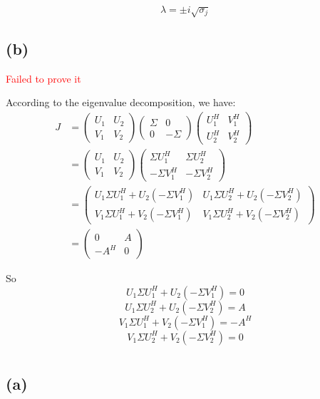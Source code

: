 \documentclass{article}
\begin{document}
$$
\lambda=\pm i\sqrt{\sigma_j}
$$

\subsection*{(b)} 

\textcolor{red}{Failed to prove it}

According to the eigenvalue decomposition, we have:
\begin{align*}
	J &= \begin{pmatrix} U_1 & U_2 \\ V_1 & V_2 \end{pmatrix} \begin{pmatrix} \Sigma & 0 \\ 0 & -\Sigma \end{pmatrix} \begin{pmatrix} U_1^H & V_1^H \\ U_2^H & V_2^H \end{pmatrix}\\
	&= \begin{pmatrix} U_1 & U_2 \\ V_1 & V_2 \end{pmatrix} \begin{pmatrix} \Sigma U_1^H & \Sigma U_2^H \\ -\Sigma V_1^H & -\Sigma V_2^H \end{pmatrix}\\
	&=\begin{pmatrix} U_1\Sigma U_1^H + U_2(-\Sigma V_1^H) & U_1\Sigma U_2^H + U_2(-\Sigma V_2^H) \\ V_1\Sigma U_1^H + V_2(-\Sigma V_1^H) & V_1\Sigma U_2^H + V_2(-\Sigma V_2^H) \end{pmatrix}\\
	&= \begin{pmatrix} 0 & A \\ -A^H & 0 \end{pmatrix}
\end{align*}

So
$$ U_1\Sigma U_1^H + U_2(-\Sigma V_1^H) = 0 $$
$$ U_1\Sigma U_2^H + U_2(-\Sigma V_2^H) = A $$
$$ V_1\Sigma U_1^H + V_2(-\Sigma V_1^H) = -A^H $$
$$ V_1\Sigma U_2^H + V_2(-\Sigma V_2^H) = 0 $$

\section{}

\subsection*{(a)} 
\end{document}
